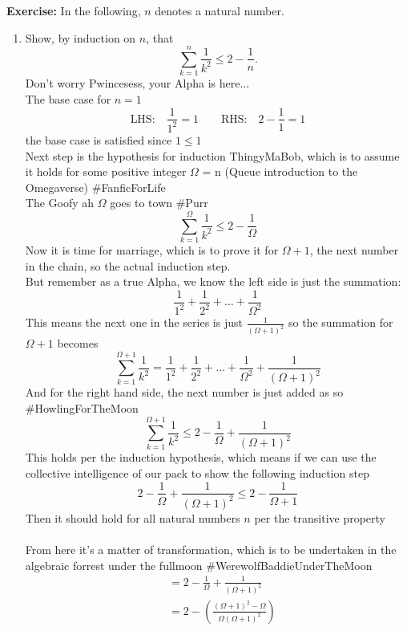 \documentclass[12pt]{article}
\begin{document}
\textbf{Exercise:} In the following, $n$ denotes a natural number.

\begin{enumerate}
    \item Show, by induction on $n$, that
    \[
        \sum_{k=1}^{n} \frac{1}{k^2} \leq 2 - \frac{1}{n}.
    \]
    Don't worry Pwincesess, your Alpha is here...\\
    The base case for $n = 1$
    \[
    \text{LHS:} \quad \frac{1}{1^2} = 1 \qquad \text{RHS:} \quad 2-\frac{1}{1} = 1
    \]
    the base case is satisfied since $1 \leq 1$\\
    Next step is the hypothesis for induction ThingyMaBob, which is to assume it holds for some positive integer $\Omega$ = n (Queue introduction to the Omegaverse) \#FanficForLife\\
    The Goofy ah $\Omega$ goes to town \#Purr 
    \[
        \sum_{k=1}^{\Omega}\frac{1}{k^2} \leq 2-\frac{1}{\Omega}
    \]
    Now it is time for marriage, which is to prove it for $\Omega + 1$, the next number in the chain, so the actual induction step.\\
    But remember as a true Alpha, we know the left side is just the summation:
    \[
        \frac{1}{1^2} + \frac{1}{2^2} + \hdots + \frac{1}{\Omega^2}
    \]
    This means the next one in the series is just $\frac{1}{(\Omega + 1)^2}$ so the summation for $\Omega +1$ becomes
    \[
    \sum_{k=1}^{\Omega+1} \frac{1}{k^2} = \frac{1}{1^2} + \frac{1}{2^2} + \hdots + \frac{1}{\Omega^2} + \frac{1}{(\Omega+1)^2}
    \]
    And for the right hand side, the next number is just added as so \#HowlingForTheMoon
    \[
     \sum_{k=1}^{\Omega+1} \frac{1}{k^2} \leq 2 - \frac{1}{\Omega} + \frac{1}{(\Omega + 1)^2}
    \]
    This holds per the induction hypothesis, which means if we can use the collective intelligence of our pack to show the following induction step
    \[
        2 - \frac{1}{\Omega} + \frac{1}{(\Omega + 1)^2} \leq 2 - \frac{1}{\Omega + 1}
    \]
    Then it should hold for all natural numbers $n$ per the transitive property\\\\
    From here it's a matter of transformation, which is to be undertaken in the algebraic forrest under the fullmoon \#WerewolfBaddieUnderTheMoon\\
\begingroup
\addtolength{\jot}{1em}
\begin{align}
&= 2 - \frac{1}{\Omega} + \frac{1}{(\Omega + 1)^2} \\
&= 2 - \left( \frac{(\Omega + 1)^2 - \Omega}{\Omega(\Omega + 1)^2} \right) \\

\end{align}
\end{enumerate}
\end{document}
